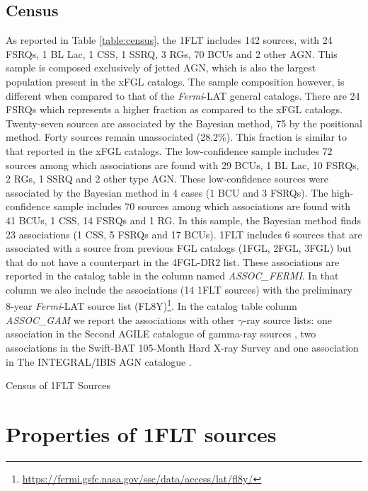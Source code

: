 \documentclass{aastex62}
\newcommand\fermilat{{\it Fermi}-LAT }
\begin{document}
\subsection{Census}\label{sec:census}
As reported in Table \ref{table:census}, the 1FLT includes 142 sources, with 24 FSRQs, 1 BL Lac, 1 CSS, 1 SSRQ, 3 RGs, 70 BCUs and 2 other AGN.
This sample is composed exclusively of jetted AGN, which is also the largest population present in the xFGL catalogs. The sample composition however, is different when compared to that of the \fermilat general catalogs. There are 24 FSRQs which represents a higher fraction as compared to the xFGL catalogs.
Twenty-seven sources are associated by the Bayesian method, 75 by the positional method. Forty sources remain unassociated (28.2\%). This fraction is similar to that reported in the xFGL catalogs.
The low-confidence sample includes 72 sources among which associations are found with 29 BCUs, 1 BL Lac, 10 FSRQs, 2 RGs, 1 SSRQ and 2 other type AGN. 
These low-confidence sources were associated by the Bayesian method in 4 cases (1 BCU and 3 FSRQs).
The high-confidence sample includes 70 sources among which associations are found with 41 BCUs, 1 CSS, 14 FSRQs and 1 RG. In this sample, the Bayesian method finds 23 associations (1 CSS, 5 FSRQs and 17 BCUs).
1FLT includes 6 sources that are associated with a source from previous FGL catalogs (1FGL, 2FGL, 3FGL) but that do not have a counterpart in the 4FGL-DR2 list. These associations are reported in the catalog table in the column named {\it ASSOC\_FERMI}. In that column we also include the associations (14 1FLT sources) with the preliminary 8-year \fermilat source list (FL8Y)\footnote{\url{https://fermi.gsfc.nasa.gov/ssc/data/access/lat/fl8y/}}. In the catalog table column {\it ASSOC\_GAM} we report the associations with other $\gamma$-ray source lists: one association in the Second AGILE catalogue of gamma-ray sources \citep{2019A&A...627A..13B}, two associations in the Swift-BAT 105-Month Hard X-ray Survey \citep{2018ApJS..235....4O} and one association in The INTEGRAL/IBIS AGN catalogue \citep{2016MNRAS.460...19M}. 
\begin{table}
\centering
\caption{Census of 1FLT Sources}

\end{table}\label{table:census}


\section{Properties of 1FLT sources}\label{sec:properties}
\end{document}
